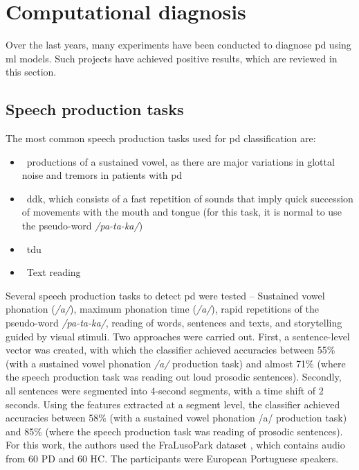 
\section{Computational diagnosis}

Over the last years, many experiments have been conducted to diagnose \gls{pd} using \gls{ml} models. Such projects have achieved positive results, which are reviewed in this section.

\subsection{Speech production tasks}

The most common speech production tasks used for \gls{pd} classification are:
\\
\begin{itemize}
	\item ~productions of a sustained vowel, as there are major variations in glottal noise and tremors in patients with \gls{pd} \cite{idiopathic_parkinson}
	\item ~\gls{ddk}, which consists of a fast repetition of sounds that imply quick succession of movements with the mouth and tongue (for this task, it is normal to use the pseudo-word \textit{/pa-ta-ka/})
	\item ~\gls{tdu}
	\item ~Text reading
\end{itemize}

Several speech production tasks to detect \gls{pd} were tested \cite{parkinson_acoustic_pompilli} -- Sustained vowel phonation (\textit{/a/}), maximum phonation time (\textit{/a/}), rapid repetitions of the pseudo-word \textit{/pa-ta-ka/}, reading of words, sentences and texts, and storytelling guided by visual stimuli. Two approaches were carried out. First, a sentence-level vector was created, with which the classifier achieved accuracies between 55\% (with a sustained vowel phonation \textit{/a/} production task) and almost 71\% (where the speech production task was reading out loud prosodic sentences). Secondly, all sentences were segmented into 4-second segments, with a time shift of 2 seconds. Using the features extracted at a segment level, the classifier achieved accuracies between 58\% (with a sustained vowel phonation /a/ production task) and 85\% (where the speech production task was reading of prosodic sentences). For this work, the authors used the FraLusoPark dataset \cite{fralusopark}, which contains audio from 60 PD and 60 HC. The participants were European Portuguese speakers.

